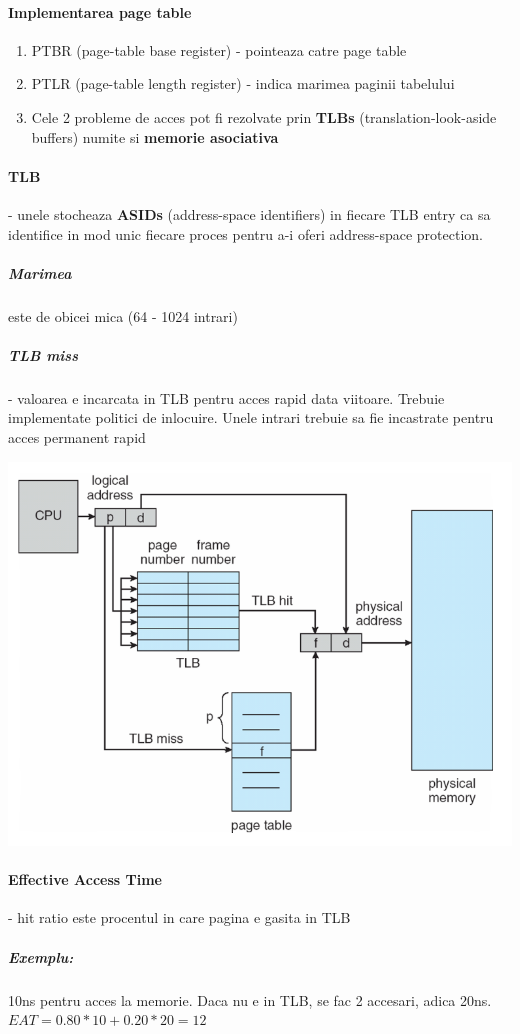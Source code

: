 \documentclass{article}
\begin{document}
\paragraph*{Implementarea page table}
\begin{enumerate}
    \item PTBR (page-table base register) - pointeaza catre page table
    \item PTLR (page-table length register) - indica marimea paginii tabelului
    \item Cele 2 probleme de acces pot fi rezolvate prin \textbf{TLBs} (translation-look-aside buffers) numite si \textbf{memorie asociativa}
\end{enumerate}

\paragraph*{TLB} - unele stocheaza \textbf{ASIDs} (address-space identifiers) in fiecare TLB entry ca sa identifice in mod unic fiecare proces pentru a-i oferi address-space protection.
\subparagraph*{Marimea} este de obicei mica (64 - 1024 intrari)
\subparagraph*{TLB miss} - valoarea e incarcata in TLB pentru acces rapid data viitoare. Trebuie implementate politici de inlocuire. Unele intrari trebuie sa fie incastrate pentru acces permanent rapid

\begin{center}
    \includegraphics[scale=0.4]{20_tlbhardware.png}
\end{center}

\paragraph*{Effective Access Time} - hit ratio este procentul in care pagina e gasita in TLB
\subparagraph*{Exemplu:} 10ns pentru acces la memorie. Daca nu e in TLB, se fac 2 accesari, adica 20ns. $EAT=0.80*10+0.20*20=12$
\end{document}
